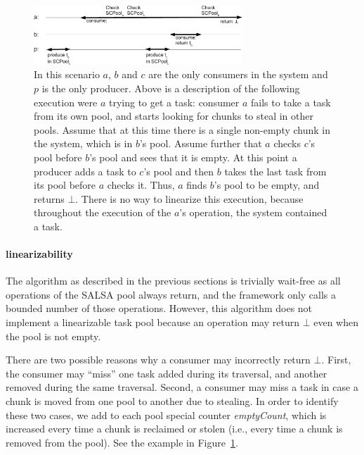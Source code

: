 \begin{figure}[htb]
	\centering
	\includegraphics[width=0.7\textwidth]{figures/linearizability-example}
	\caption{\footnotesize{In this scenario $a$, $b$ and $c$ are the only consumers in the system and $p$ is the only producer. Above is a description of the following execution were $a$ trying to get a task: consumer $a$ fails to take a task from its own pool, and starts looking for chunks to steal in other pools. Assume that at this time there is a single non-empty chunk in the system, which is in $b$'s pool. Assume further that $a$ checks $c$'s pool before $b$'s pool and sees that it is empty. At this point a producer adds a task to $c$'s pool and then $b$ takes the last task from its pool before $a$ checks it. Thus, $a$ finds $b$'s pool to be empty, and returns $\bot$. There is no way to linearize this execution, because throughout the execution of the $a$'s operation, the system contained a task.}}
	\label{fig:linearizability-example}
\end{figure}

\paragraph{linearizability}
The algorithm as described in the previous sections is trivially wait-free as all operations of the SALSA pool always return, and the framework only calls a bounded number of those operations. However, this algorithm does not implement a linearizable task pool because an operation may return $\bot$ even when the pool is not empty. 

There are two possible reasons why a consumer may incorrectly return $\bot$. First, the consumer may ``miss'' one task added during its traversal, and another removed during the same traversal. Second, a consumer may miss a task in case a chunk is moved from one pool to another due to stealing. In order to identify these two cases, we add to each pool special counter \emph{emptyCount}, which is increased every time a chunk is reclaimed or stolen (i.e., every time a chunk is removed from the pool).
See the example in Figure~\ref{fig:linearizability-example}.

